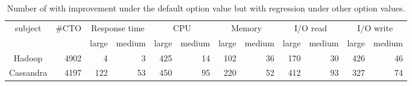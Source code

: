 \begin{table}[t]
\tabcolsep=0.08cm
\caption{Number of \instance with improvement under the default option value but with regression under other option values.}
    \begin{tabular}{|c|c|c|r|c|r|c|r|c|r|c|r|}
    \hline
    \multirow{2}{*}{subject} & \multirow{2}{*}{\#CTO}    & \multicolumn{2}{c|}{Response time}    & \multicolumn{2}{c|}{CPU}       & \multicolumn{2}{c|}{Memory}    & \multicolumn{2}{c|}{I/O read}  & \multicolumn{2}{c|}{I/O write} \\ \cline{3-12} 
     &   & large   & \multicolumn{1}{c|}{medium} & large   & \multicolumn{1}{c|}{medium} & large   & \multicolumn{1}{c|}{medium} & large   & \multicolumn{1}{c|}{medium} & large   & \multicolumn{1}{c|}{medium} \\ \hline
    Hadoop  & \multicolumn{1}{r|}{4902} & \multicolumn{1}{r|}{4}   & 3   & \multicolumn{1}{r|}{425} & 14  & \multicolumn{1}{r|}{102} & 36  & \multicolumn{1}{r|}{170} & 30  & \multicolumn{1}{r|}{426} & 46  \\ \hline
    Cassandra                & \multicolumn{1}{r|}{4197} & \multicolumn{1}{r|}{122} & 53  & \multicolumn{1}{r|}{450} & 95 & \multicolumn{1}{r|}{220} & 52  & \multicolumn{1}{r|}{412} & 93 & \multicolumn{1}{r|}{327} & 74  \\ \hline
    \end{tabular}
\label{tab:option_improvement_default}
\end{table}

